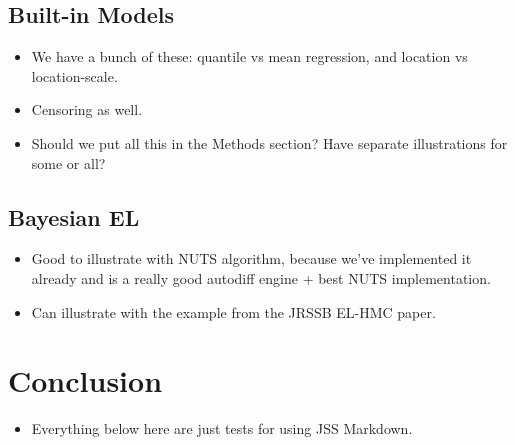 \documentclass[article]{jss}
\providecommand{\tightlist}{%
  \setlength{\itemsep}{0pt}\setlength{\parskip}{0pt}}
\renewcommand{\|}{\,|\,}
\begin{document}
\hypertarget{built-in-models}{%
\subsection{Built-in Models}\label{built-in-models}}

\begin{itemize}
\item
  We have a bunch of these: quantile vs mean regression, and location vs location-scale.
\item
  Censoring as well.
\item
  Should we put all this in the Methods section? Have separate illustrations for some or all?
\end{itemize}

\hypertarget{bayesian-el}{%
\subsection{Bayesian EL}\label{bayesian-el}}

\begin{itemize}
\item
  Good to illustrate with  NUTS algorithm, because we've implemented it already and  is a really good autodiff engine + best NUTS implementation.
\item
  Can illustrate with the example from the JRSSB EL-HMC paper.
\end{itemize}

\hypertarget{conclusion}{%
\section{Conclusion}\label{conclusion}}

\begin{itemize}
\tightlist
\item
  Everything below here are just tests for using JSS Markdown.
\end{itemize}
\end{document}
